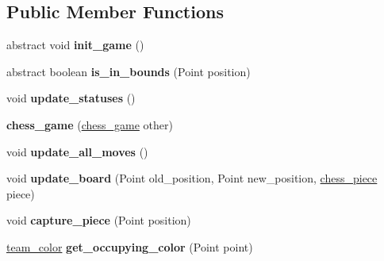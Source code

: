 \subsection*{Public Member Functions}
\begin{DoxyCompactItemize}
\item 
\hypertarget{classchess__core_1_1chess__game_a99875295918d6625376849679319241b}{}abstract void {\bfseries init\+\_\+game} ()\label{classchess__core_1_1chess__game_a99875295918d6625376849679319241b}

\item 
\hypertarget{classchess__core_1_1chess__game_a9e94ac59c3ae17be159ce6c0df8e0274}{}abstract boolean {\bfseries is\+\_\+in\+\_\+bounds} (Point position)\label{classchess__core_1_1chess__game_a9e94ac59c3ae17be159ce6c0df8e0274}

\item 
\hypertarget{classchess__core_1_1chess__game_adbe4c11477e6944d8b2d5f593374849a}{}void {\bfseries update\+\_\+statuses} ()\label{classchess__core_1_1chess__game_adbe4c11477e6944d8b2d5f593374849a}

\item 
\hypertarget{classchess__core_1_1chess__game_a84ed035e51594ec6e4c52682e87307ac}{}{\bfseries chess\+\_\+game} (\hyperlink{classchess__core_1_1chess__game}{chess\+\_\+game} other)\label{classchess__core_1_1chess__game_a84ed035e51594ec6e4c52682e87307ac}

\item 
\hypertarget{classchess__core_1_1chess__game_a5ebd04c4b1b82ce5e26dbe1f8e18b1ce}{}void {\bfseries update\+\_\+all\+\_\+moves} ()\label{classchess__core_1_1chess__game_a5ebd04c4b1b82ce5e26dbe1f8e18b1ce}

\item 
\hypertarget{classchess__core_1_1chess__game_a3460924fb30b8f9a04ce25db76f124dc}{}void {\bfseries update\+\_\+board} (Point old\+\_\+position, Point new\+\_\+position, \hyperlink{classchess__core_1_1chess__piece}{chess\+\_\+piece} piece)\label{classchess__core_1_1chess__game_a3460924fb30b8f9a04ce25db76f124dc}

\item 
\hypertarget{classchess__core_1_1chess__game_a868b923e9dc89aa1bac92f108d99c769}{}void {\bfseries capture\+\_\+piece} (Point position)\label{classchess__core_1_1chess__game_a868b923e9dc89aa1bac92f108d99c769}

\item 
\hypertarget{classchess__core_1_1chess__game_a302ddb48ccde5fb6237c314dc5c2dce5}{}\hyperlink{enumchess__core_1_1team__color}{team\+\_\+color} {\bfseries get\+\_\+occupying\+\_\+color} (Point point)\label{classchess__core_1_1chess__game_a302ddb48ccde5fb6237c314dc5c2dce5}


\end{DoxyCompactItemize}
